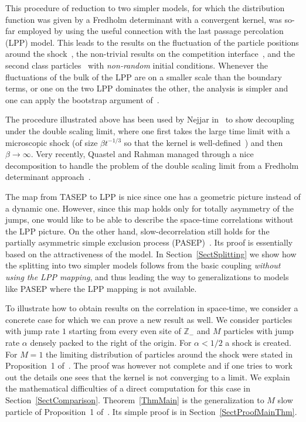 \documentclass[12pt,a4paper]{article}
\numberwithin{equation}{section}
\newcommand{\Z}{\mathbb{Z}}
\begin{document}
This procedure of reduction to two simpler models, for which the distribution function was given by a Fredholm determinant with a convergent kernel, was so-far employed by using the useful connection with the last passage percolation (LPP) model. This leads to the results on the fluctuation of the particle positions around the shock~\cite{FN13}, the non-trivial results on the competition interface~\cite{FN16}, and the second class particles~\cite{FGN17} with \emph{non-random} initial conditions. Whenever the fluctuations of the bulk of the LPP are on a smaller scale than the boundary terms, or one on the two LPP dominates the other, the analysis is simpler and one can apply the bootstrap argument of~\cite{BC09}.

The procedure illustrated above has been used by Nejjar in~\cite{N17} to show decoupling under the double scaling limit, where one first takes the large time limit with a microscopic shock (of size $\beta t^{-1/3}$ so that the kernel is well-defined~\cite{FN14}) and then $\beta\to\infty$. Very recently, Quastel and Rahman managed through a nice decomposition to handle the problem of the double scaling limit from a Fredholm determinant approach~\cite{QR18}.

The map from TASEP to LPP is nice since one has a geometric picture instead of a dynamic one. However, since this map holds only for totally asymmetry of the jumps, one would like to be able to describe the space-time correlations without the LPP picture. On the other hand, slow-decorrelation still holds for the partially asymmetric simple exclusion process (PASEP)~\cite{CFP10b}. Its proof is essentially based on the attractiveness of the model. In Section~\ref{SectSplitting} we show how the splitting into two simpler models follows from the basic coupling \emph{without using the LPP mapping}, and thus leading the way to generalizations to models like PASEP where the LPP mapping is not available.

To illustrate how to obtain results on the correlation in space-time, we consider a concrete case for which we can prove a new result as well. We consider particles with jump rate $1$ starting from every even site of $\Z_-$ and $M$ particles with jump rate $\alpha$ densely packed to the right of the origin. For $\alpha<1/2$ a shock is created. For $M=1$ the limiting distribution of particles around the shock were stated in Proposition~1 of~\cite{BFS09}. The proof was however not complete and if one tries to work out the details one sees that the kernel is not converging to a limit. We explain the mathematical difficulties of a direct computation for this case in Section~\ref{SectComparison}. Theorem~\ref{ThmMain} is the generalization to $M$ slow particle of Proposition~1 of~\cite{BFS09}. Its simple proof is in Section~\ref{SectProofMainThm}.
\end{document}
